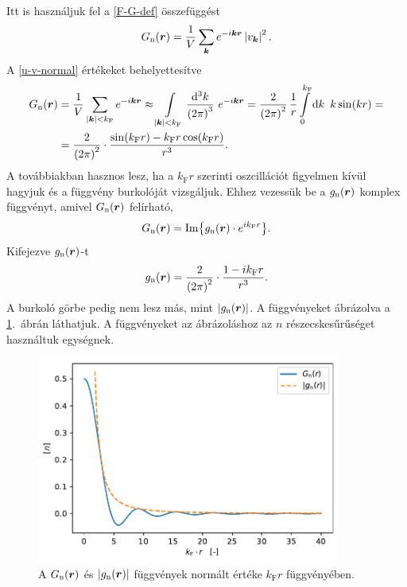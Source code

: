 \documentclass[a4paper,12pt,titlepage]{article}
\newcommand{\KK}{{\vb*{k}}}
\newcommand{\RR}{{\vb*{r}}}
\newcommand{\kF}{{k_\text{F}}}
\begin{document}
Itt is használjuk fel a \eqref{F-G-def} összefüggést
\begin{equation}
	G_\text{n}(\RR) = \frac{1}{V} \sum\limits_\KK e^{-i \KK \RR} \left| v_\KK \right|^2.
\end{equation}
A \eqref{u-v-normal} értékeket behelyettesítve
\begin{equation}
\begin{split}
	G_\text{n}(\RR) & = \frac{1}{V} \sum\limits_{\left| \KK \right| < \kF} e^{-i \KK \RR} \approx \int\limits_{\left| \KK \right| < \kF} \frac{\dd[3]k}{\left( 2 \pi \right)^3} ~ e^{-i \KK \RR} = \frac{2}{\left( 2 \pi \right)^2} \, \frac{1}{r} \int\limits_0^{\kF} \dd{k} ~ k \sin(k r) = \\
	& = \frac{2}{\left( 2 \pi \right)^2} \cdot \frac{\sin(\kF r) - \kF r \cos(\kF r)}{r^3}.
\end{split}
\end{equation}
A továbbiakban hasznos lesz, ha a $\kF r$ szerinti oszcillációt figyelmen kívül hagyjuk és a függvény burkolóját vizsgáljuk.  Ehhez vezessük be a $g_\text{n}(\RR)$ komplex függvényt, amivel $G_\text{n}(\RR)$ felírható,
\begin{equation}
	G_\text{n}(\RR) = \Im{g_\text{n}(\RR) \cdot e^{i \kF r}}.
\end{equation}
Kifejezve $g_\text{n}(\RR)$-t
\begin{equation}
	g_\text{n}(\RR) = \frac{2}{\left( 2 \pi \right)^2} \cdot \frac{1 - i \kF r}{r^3}.
\end{equation}
A burkoló görbe pedig nem lesz más, mint $\left| g_\text{n}(\RR) \right|$.  A függvényeket ábrázolva a \ref{G-normal-fig}.\ ábrán láthatjuk.  A függvényeket az ábrázoláshoz az $n$ részecskesűrűséget használtuk egységnek.
\begin{figure}[h!]
	\centering
	\includegraphics[width=10cm]{G_normal.pdf}
	\caption{A $G_\text{n}(\RR)$ és $\left| g_\text{n}(\RR) \right|$ függvények normált értéke $\kF r$ függvényében.}
	\label{G-normal-fig}
\end{figure}
\end{document}
